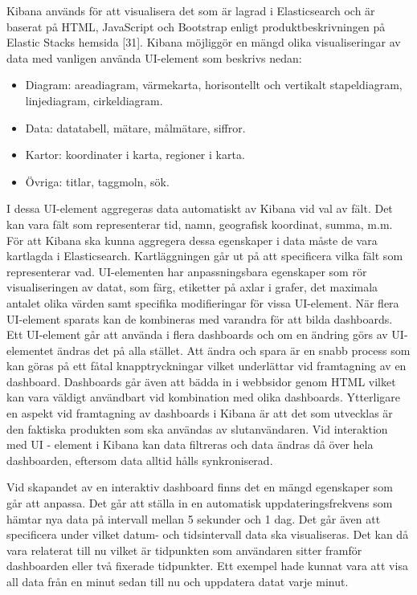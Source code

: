 \documentclass[12pt]{kththesis}
\begin{document}
Kibana används för att visualisera det som är lagrad i Elasticsearch och är baserat på HTML, JavaScript och Bootstrap enligt produktbeskrivningen på Elastic Stacks hemsida [31]. Kibana möjliggör en mängd olika visualiseringar av data med vanligen använda UI-element som beskrivs nedan:

\begin{itemize}
\item Diagram: areadiagram, värmekarta, horisontellt och vertikalt stapeldiagram, linjediagram, cirkeldiagram.
\item Data: datatabell, mätare, målmätare, siffror.
\item Kartor: koordinater i karta, regioner i karta.
\item Övriga: titlar, taggmoln, sök.
\end{itemize}

I dessa UI-element aggregeras data automatiskt av Kibana vid val av fält. Det kan vara fält som representerar tid, namn, geografisk koordinat, summa, m.m. För att Kibana ska kunna aggregera dessa egenskaper i data måste de vara kartlagda i Elasticsearch. Kartläggningen går ut på att specificera vilka fält som representerar vad. UI-elementen har anpassningsbara egenskaper som rör visualiseringen av datat, som färg, etiketter på axlar i grafer, det maximala antalet olika värden samt specifika modifieringar för vissa UI-element. När flera UI-element sparats kan de kombineras med varandra för att bilda dashboards. Ett UI-element går att använda i flera dashboards och om en ändring görs av UI-elementet ändras det på alla stället. Att ändra och spara är en snabb process som kan göras på ett fåtal knapptryckningar vilket underlättar vid framtagning av en dashboard. Dashboards går även att bädda in i webbsidor genom HTML vilket kan vara väldigt användbart vid kombination med olika dashboards. Ytterligare en aspekt vid framtagning av dashboards i Kibana är att det som utvecklas är den faktiska produkten som ska användas av slutanvändaren. Vid interaktion med UI - element i Kibana kan data filtreras och data ändras då över hela dashboarden, eftersom data alltid hålls synkroniserad.

Vid skapandet av en interaktiv dashboard finns det en mängd egenskaper som går att anpassa. Det går att ställa in en automatisk uppdateringsfrekvens som hämtar nya data på intervall mellan 5 sekunder och 1 dag. Det går även att specificera under vilket datum- och tidsintervall data ska visualiseras. Det kan då vara relaterat till nu vilket är tidpunkten som användaren sitter framför dashboarden eller två fixerade tidpunkter. Ett exempel hade kunnat vara att visa all data från en minut sedan till nu och uppdatera datat varje minut.
\end{document}
